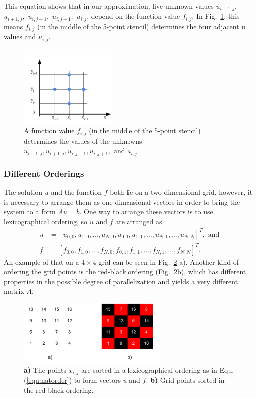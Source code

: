 This equation shows that in our approximation, five unknown values $u_{i-1,j},$ $u_{i+1,j},$ $u_{i,j-1},$ $u_{i,j+1},$ $u_{i,j}$, depend on the function value $f_{i,j}$. In Fig.~\ref{fig:nat_order}, this means $f_{i,j}$ (in the middle of the 5-point stencil) determines the four adjacent u values and $u_{i,j}$.

\begin{figure}[h]
	\centering
\includegraphics[width=0.42\textwidth]{chapters/chapter01/linear_order.pdf}
	\caption{A function value $f_{i,j}$ (in the middle of the 5-point stencil) determines the values of the unknowns $u_{i-1,j}, u_{i+1,j}, u_{i,j-1}, u_{i,j+1}, \textrm{ and } u_{i,j}$. }
	\label{fig:nat_order}
\end{figure}

\subsubsection*{Different Orderings}
The solution $u$ and the function $f$ both lie on a two dimensional grid, however, it is  necessary to arrange them as one dimensional vectors in order to bring the system to a form $Au = b$. One way to arrange these vectors is to use lexicographical ordering, so $u$ and $f$ are arranged as
\begin{align}
u &= [u_{0,0}, u_{1,0}, \hdots, u_{N,0}, u_{0,1}, u_{1,1}, \hdots, u_{N,1}, \hdots, u_{N,N} ]^T, \textrm{ and} \label{equ:natorder} \\
f &= [f_{0,0}, f_{1,0}, \hdots, f_{N,0}, f_{0,1}, f_{1,1}, \hdots, f_{N,1}, \hdots, f_{N,N} ]^T. \nonumber
\end{align}
An example of that  on a $4\times 4$ grid can be seen in Fig.~\ref{fig:nat_order_lexi_rb} a). Another kind of ordering the grid points is the red-black ordering (Fig.~\ref{fig:nat_order_lexi_rb}b), which has different properties in the possible degree of parallelization and yields a very different matrix $A$.


\begin{figure}[h]
	\centering
	\includegraphics[width=0.65\textwidth]{chapters/chapter01/linear_order_lexi_rb.pdf}
	\caption{\textbf{a)} The points $x_{i,j}$ are sorted in a lexicographical ordering as in Equ. (\ref{equ:natorder}) to form vectors $u$ and $f$. \textbf{b)} Grid points sorted in the red-black ordering.}
	\label{fig:nat_order_lexi_rb}
\end{figure}

